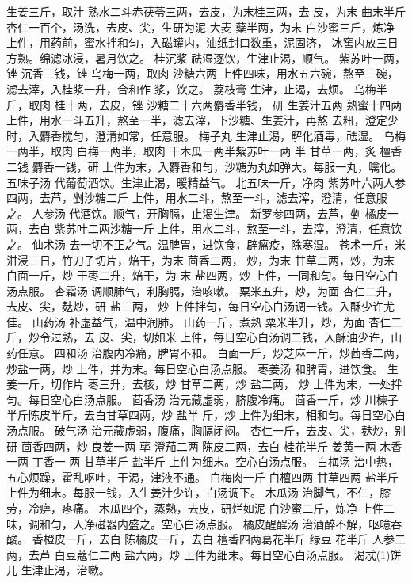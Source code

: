 \documentclass[12pt,UTF8]{ctexbook}
\begin{document}
生姜三斤，取汁 熟水二斗赤茯苓三两，去皮，为末桂三两，去
皮，为末 曲末半斤 杏仁一百个，汤洗，去皮、尖，生研为泥 大麦
糵半两，为末 白沙蜜三斤，炼净
上件，用药前，蜜水拌和匀，入磁罐内，油纸封口数重，泥固济，
冰窖内放三日方熟。绵滤冰浸，暑月饮之。
桂沉浆 祛湿逐饮，生津止渴，顺气。
紫苏叶一两，锉 沉香三钱，锉 乌梅一两，取肉 沙糖六两
上件四味，用水五六碗，熬至三碗，滤去滓，入桂浆一升，合和作
浆，饮之。
荔枝膏 生津，止渴，去烦。
乌梅半斤，取肉 桂十两，去皮，锉 沙糖二十六两麝香半钱，
研 生姜汁五两 熟蜜十四两
上件，用水一斗五升，熬至一半，滤去滓，下沙糖、生姜汁，再熬
去籸，澄定少时，入麝香搅匀，澄清如常，任意服。
梅子丸 生津止渴，解化酒毒，祛湿。
乌梅一两半，取肉 白梅一两半，取肉 干木瓜一两半紫苏叶一两
半 甘草一两，炙 檀香二钱 麝香一钱，研
上件为末，入麝香和匀，沙糖为丸如弹大。每服一丸，噙化。
五味子汤 代葡萄酒饮。生津止渴，暖精益气。
北五味一斤，净肉 紫苏叶六两人参四两，去芦，剉沙糖二斤
上件，用水二斗，熬至一斗，滤去滓，澄清，任意服之。
人参汤 代酒饮。顺气，开胸膈，止渴生津。
新罗参四两，去芦，剉 橘皮一两，去白 紫苏叶二两沙糖一斤
上件，用水二斗，熬至一斗，去滓，澄清，任意饮之。
仙术汤 去一切不正之气。温脾胃，进饮食，辟瘟疫，除寒湿。
苍术一斤，米泔浸三日，竹刀子切片，焙干，为末 茴香二两，
炒，为末 甘草二两，炒，为末 白面一斤，炒 干枣二升，焙干，为
末 盐四两，炒
上件，一同和匀。每日空心白汤点服。
杏霜汤 调顺肺气，利胸膈，治咳嗽。
粟米五升，炒，为面 杏仁二升，去皮、尖，麸炒，研 盐三两，
炒
上件拌匀，每日空心白汤调一钱。入酥少许尤佳。
山药汤 补虚益气，温中润肺。
山药一斤，煮熟 粟米半升，炒，为面 杏仁二斤，炒令过熟，去
皮、尖，切如米
上件，每日空心白汤调二钱，入酥油少许，山药任意。
四和汤 治腹内冷痛，脾胃不和。
白面一斤，炒芝麻一斤，炒茴香二两，炒盐一两，炒
上件，并为末。每日空心白汤点服。
枣姜汤 和脾胃，进饮食。
生姜一斤，切作片 枣三升，去核，炒 甘草二两，炒 盐二两，
炒
上件为末，一处拌匀。每日空心白汤点服。
茴香汤 治元藏虚弱，脐腹冷痛。
茴香一斤，炒 川楝子半斤陈皮半斤，去白甘草四两，炒 盐半
斤，炒
上件为细末，相和匀。每日空心白汤点服。
破气汤 治元藏虚弱，腹痛，胸膈闭闷。
杏仁一斤，去皮、尖，麸炒，别研 茴香四两，炒 良姜一两 荜
澄茄二两 陈皮二两，去白 桂花半斤 姜黄一两 木香一两 丁香一
两 甘草半斤 盐半斤
上件为细末。空心白汤点服。
白梅汤 治中热，五心烦躁，霍乱呕吐，干渴，津液不通。
白梅肉一斤 白檀四两 甘草四两 盐半斤
上件为细末。每服一钱，入生姜汁少许，白汤调下。
木瓜汤 治脚气，不仁，膝劳，冷痹，疼痛。
木瓜四个，蒸熟，去皮，研烂如泥 白沙蜜二斤，炼净
上件二味，调和匀，入净磁器内盛之。空心白汤点服。
橘皮醒酲汤 治酒醉不解，呕噫吞酸。
香橙皮一斤，去白 陈橘皮一斤，去白 檀香四两葛花半斤 绿豆
花半斤 人参二两，去芦 白豆蔻仁二两 盐六两，炒
上件为细末。每日空心白汤点服。
渴忒(1)饼儿 生津止渴，治嗽。
\end{document}
